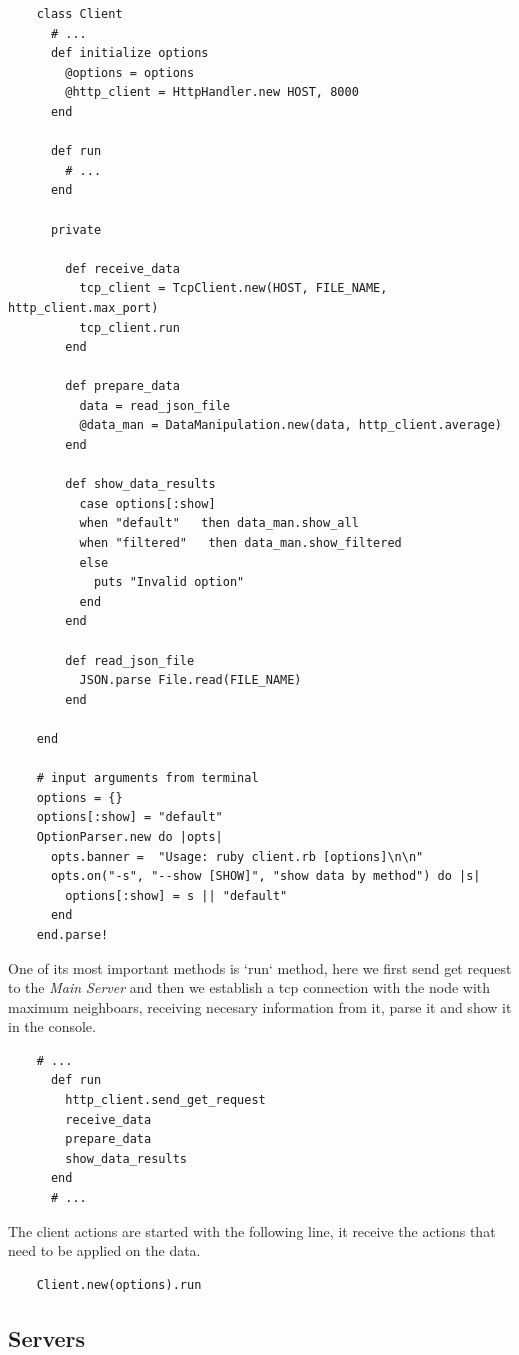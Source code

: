 \documentclass[12pt]{article}
\begin{document}
    \begin{lstlisting}
    class Client
      # ... 
      def initialize options
        @options = options
        @http_client = HttpHandler.new HOST, 8000
      end

      def run
        # ...
      end

      private

        def receive_data
          tcp_client = TcpClient.new(HOST, FILE_NAME, http_client.max_port)
          tcp_client.run
        end

        def prepare_data
          data = read_json_file
          @data_man = DataManipulation.new(data, http_client.average)
        end

        def show_data_results
          case options[:show]
          when "default"   then data_man.show_all
          when "filtered"   then data_man.show_filtered
          else
            puts "Invalid option"
          end
        end

        def read_json_file
          JSON.parse File.read(FILE_NAME)
        end

    end

    # input arguments from terminal
    options = {}
    options[:show] = "default"
    OptionParser.new do |opts|
      opts.banner =  "Usage: ruby client.rb [options]\n\n"
      opts.on("-s", "--show [SHOW]", "show data by method") do |s|
        options[:show] = s || "default"
      end
    end.parse!
    \end{lstlisting}

    One of its most important methods is `run` method, here we first send
    get request to the \textit{Main Server} and then we establish a tcp connection with the node
    with maximum neighboars, receiving necesary information from it, parse it and show it
    in the console.

    \begin{lstlisting}
    # ...
      def run
        http_client.send_get_request
        receive_data
        prepare_data
        show_data_results
      end
      # ...
    \end{lstlisting}

    The client actions are started with the following line, it receive the actions that need to be applied on the data.

    \begin{lstlisting}
    Client.new(options).run
    \end{lstlisting}

    \subsection{Servers}
\end{document}
